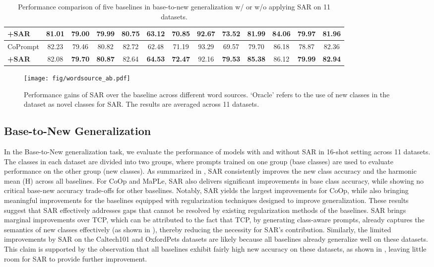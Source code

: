 \begin{table*}[htbp]
\begin{tabular}{l|ccc|ccc|ccc|ccc}
\textbf{+SAR} &\textbf{81.01} &\textbf{79.00} &\textbf{79.99} &\textbf{80.75} &\textbf{63.12} &\textbf{70.85} &\textbf{92.67} &\textbf{73.52} &\textbf{81.99} &\textbf{84.06} &\textbf{79.97} &\textbf{81.96}\\
\hline
{CoPrompt} \cite{roy2024coprompt} &82.23 &79.46 &80.82 &82.72 &62.48 &71.19 &93.29 &69.57 &79.70 &86.18 &78.87 &82.36\\
\textbf{+SAR} &82.08 &\textbf{79.70} &\textbf{80.87} &82.64 &\textbf{64.53} &\textbf{72.47} &92.16 &\textbf{79.53} &\textbf{85.38} &86.12 &\textbf{79.99} &\textbf{82.94}\\
\hline
    \end{tabular}
    \vspace{+0.0em}
    \caption{Performance comparison of five baselines in base-to-new generalization w/ or w/o applying SAR on 11 datasets.}
    \label{tab:b2n}
\end{table*}

\begin{figure*}[!t]
    \centering
    \texttt{[image: fig/wordsource\_ab.pdf]}
    \caption{Performance gains of SAR over the baseline across different word sources. `Oracle' refers to the use of new classes in the dataset as novel classes for SAR. The results are averaged across 11 datasets.}
    \label{fig:wordsource_ab}
\end{figure*}

\subsection{Base-to-New Generalization}
In the Base-to-New generalization task, we evaluate the performance of models with and without SAR in 16-shot setting across 11 datasets. The classes in each dataset are divided into two groups, where prompts trained on one group (base classes) are used to evaluate performance on the other group (new classes). As summarized in , SAR consistently improves the new class accuracy and the harmonic mean (H) across all baselines. For CoOp and MaPLe, SAR also delivers significant improvements in base class accuracy, while showing no critical base-new accuracy trade-offs for other baselines. Notably, SAR yields the largest improvements for CoOp, while also bringing meaningful improvements for the baselines equipped with regularization techniques designed to improve generalization. These results suggest that SAR effectively addresses gaps that cannot be resolved by existing regularization methods of the baselines. SAR brings marginal improvements over TCP, which can be attributed to the fact that TCP, by generating class-aware prompts, already captures the semantics of new classes effectively (as shown in ), thereby reducing the necessity for SAR's contribution. Similarly, the limited improvements by SAR on the Caltech101 and OxfordPets datasets are likely because all baselines already generalize well on these datasets. This claim is supported by the observation that all baselines exhibit fairly high new accuracy on these datasets, as shown in , leaving little room for SAR to provide further improvement.

